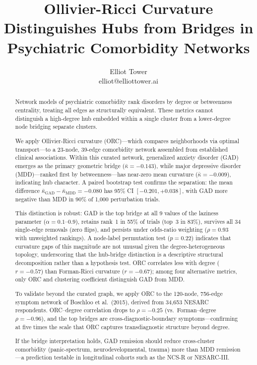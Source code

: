\documentclass{article}
\title{Ollivier-Ricci Curvature Distinguishes Hubs from Bridges in Psychiatric Comorbidity Networks}
\author{\name Elliot Tower \\
      \email elliot@elliottower.ai}
\begin{document}
\maketitle

\begin{abstract}
Network models of psychiatric comorbidity rank disorders by degree or betweenness centrality, treating all edges as structurally equivalent. These metrics cannot distinguish a high-degree hub embedded within a single cluster from a lower-degree node bridging separate clusters.

We apply Ollivier-Ricci curvature (ORC)---which compares neighborhoods via optimal transport---to a 23-node, 39-edge comorbidity network assembled from established clinical associations. Within this curated network, generalized anxiety disorder (GAD) emerges as the primary geometric bridge ($\bar\kappa = -0.143$), while major depressive disorder (MDD)---ranked first by betweenness---has near-zero mean curvature ($\bar\kappa = -0.009$), indicating hub character. A paired bootstrap test confirms the separation: the mean difference $\bar\kappa_{\text{GAD}} - \bar\kappa_{\text{MDD}} = -0.080$ has 95\% CI $[-0.201, +0.038]$, with GAD more negative than MDD in 90\% of 1{,}000 perturbation trials.

This distinction is robust: GAD is the top bridge at all 9 values of the laziness parameter ($\alpha = 0.1$--$0.9$), retains rank~1 in 55\% of trials (top~3 in 83\%), survives all 34 single-edge removals (zero flips), and persists under odds-ratio weighting ($\rho = 0.93$ with unweighted rankings). A node-label permutation test ($p = 0.22$) indicates that curvature gaps of this magnitude are not unusual given the degree-heterogeneous topology, underscoring that the hub-bridge distinction is a descriptive structural decomposition rather than a hypothesis test. ORC correlates less with degree ($r = -0.57$) than Forman-Ricci curvature ($r = -0.67$); among four alternative metrics, only ORC and clustering coefficient distinguish GAD from MDD.

To validate beyond the curated graph, we apply ORC to the 120-node, 756-edge symptom network of Boschloo et al.\ (2015), derived from 34{,}653 NESARC respondents. ORC--degree correlation drops to $\rho = -0.25$ (vs.\ Forman--degree $\rho = -0.96$), and the top bridges are cross-diagnostic-boundary symptoms---confirming at five times the scale that ORC captures transdiagnostic structure beyond degree.

If the bridge interpretation holds, GAD remission should reduce cross-cluster comorbidity (panic-spectrum, neurodevelopmental, trauma) more than MDD remission---a prediction testable in longitudinal cohorts such as the NCS-R or NESARC-III.
\end{abstract}
\end{document}
